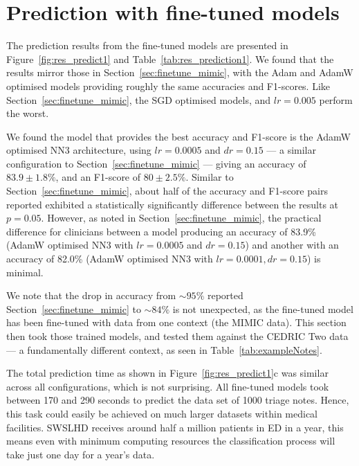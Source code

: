 \documentclass[a4paper,12pt]{article}
\newcommand{\mimicData}{MIMIC data\xspace}   %
\newcommand{\inghamTwo}{CEDRIC Two\xspace}  %
\begin{document}
\section{Prediction with fine-tuned models}


The prediction results from the fine-tuned models are presented in Figure~\ref{fig:res_predict1} and Table~\ref{tab:res_prediction1}. We found that the results mirror those in Section~\ref{sec:finetune_mimic}, with the Adam and AdamW optimised models providing roughly the same accuracies and F1-scores. Like Section~\ref{sec:finetune_mimic}, the SGD optimised models, and $lr = 0.005$ perform the worst. 

We found the model that provides the best accuracy and F1-score is the AdamW optimised \ac{NN3} architecture, using $lr = 0.0005$ and $dr = 0.15$ --- a similar configuration to Section~\ref{sec:finetune_mimic} --- giving an accuracy of $83.9 \pm 1.8\%$, and an F1-score of $80 \pm 2.5\%$. Similar to Section~\ref{sec:finetune_mimic}, about half of the accuracy and F1-score pairs reported exhibited a statistically significantly difference between the results at $p = 0.05$. However, as noted in Section~\ref{sec:finetune_mimic}, the practical difference for clinicians between a model producing an accuracy of 83.9\% (AdamW optimised \ac{NN3} with $lr = 0.0005$ and $dr = 0.15$) and another with an accuracy of 82.0\% (AdamW optimised \ac{NN3} with $lr = 0.0001, dr = 0.15$) is minimal. 


We note that the drop in accuracy from $\sim95\%$ reported Section~\ref{sec:finetune_mimic} to $\sim84\%$ is not unexpected, as the fine-tuned model has been fine-tuned with data from one context (the \mimicData). This section then took those trained models, and tested them against the \inghamTwo data --- a fundamentally different context, as seen in Table~\ref{tab:exampleNotes}. 

The total prediction time as shown in Figure~\ref{fig:res_predict1}c was similar across all configurations, which is not surprising. All fine-tuned models took between 170 and 290 seconds to predict the data set of 1000 triage notes. Hence, this task could easily be achieved on much larger datasets within medical facilities. \ac{SWSLHD} receives around half a million patients in \ac{ED} in a year, this means even with minimum computing resources the classification process will take just one day for a year's data. 
\end{document}
